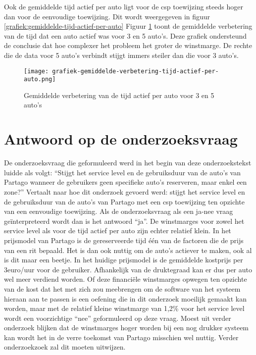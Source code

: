 Ook de gemiddelde tijd actief per auto ligt voor de csp toewijzing steeds hoger dan voor de eenvoudige toewijzing. Dit wordt weergegeven in figuur \ref{grafiek:gemiddelde-tijd-actief-per-auto} 
Figuur \ref{grafiek:gemiddelde-verbetering-tijd-actief} toont de gemiddelde verbetering van de tijd dat een auto actief was voor 3 en 5 auto's. Deze grafiek ondersteund de conclusie dat hoe complexer het probleem het groter de winstmarge. De rechte die de data voor 5 auto's verbindt stijgt immers steiler dan die voor 3 auto's.
\begin{figure}[h]
	\texttt{[image: grafiek-gemiddelde-verbetering-tijd-actief-per-auto.png]}
	\caption[Verbetering tijd actief per auto]{Gemiddelde verbetering van de tijd actief per auto voor 3 en 5 auto's}
	\label{grafiek:gemiddelde-verbetering-tijd-actief}
\end{figure}


\section{Antwoord op de onderzoeksvraag}
De onderzoeksvraag die geformuleerd werd in het begin van deze onderzoekstekst luidde als volgt: ``Stijgt het service level en de gebruiksduur van de auto's van Partago  wanneer de gebruikers geen specifieke auto's reserveren, maar enkel een zone?'' Vertaalt naar hoe dit onderzoek gevoerd werd: stijgt het service level en de gebruiksduur van de auto's van Partago met een csp toewijzing ten opzichte van een eenvoudige toewijzing. Als de onderzoeksvraag als een ja-nee vraag geïnterpreteerd wordt dan is het antwoord ``ja''. De winstmarges voor zowel het service level als voor de tijd actief per auto zijn echter relatief klein. In het prijsmodel van Partago is de gereserveerde tijd één van de factoren die de prijs van een rit bepaald. Het is dan ook nuttig om de auto's actiever te maken, ook al is dit maar een beetje. In het huidige prijsmodel is de gemiddelde kostprijs per 3euro/uur voor de gebruiker. Afhankelijk van de druktegraad kan er dus per auto wel meer verdiend worden. Of deze financiële winstmarges opwegen ten opzichte van de kost dat het met zich zou meebrengen om de software van het systeem hieraan aan te passen is een oefening die in dit onderzoek moeilijk gemaakt kan worden, maar met de relatief kleine winstmarge van 1,2\% voor het service level wordt een voorzichtige ``nee'' geformuleerd op deze vraag. Moest uit verder onderzoek blijken dat de winstmarges hoger worden bij een nog drukker systeem kan wordt het in de verre toekomst van Partago misschien wel nuttig. Verder onderzoekzoek zal dit moeten uitwijzen.

